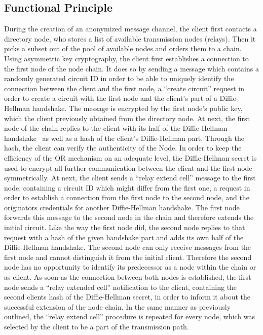 \documentclass{sig-alternate}
\begin{document}
\subsection{Functional Principle}
During the creation of an anonymized message channel, the client first contacts a directory node, who stores a list of available transmission nodes (relays).  Then it picks a subset out of the pool of available nodes and orders them to a chain. Using asymmetric key cryptography, the client first establishes a connection to the first node of the node chain. It does so by sending a message which contains a randomly generated circuit ID in order to be able to uniquely identify the connection between the client and the first node, a ``create circuit'' request in order to create a circuit with the first node and the client's part of a Diffie-Hellman handshake. The message is encrypted by the first node's public key, which the client previously obtained from the directory node. At next, the first node of the chain replies to the client with its half of the Diffie-Hellman handshake~\cite{diffie1976new} as well as a hash of the client's Diffie-Hellman part. Through the hash, the client can verify the authenticity of the Node. In order to keep the efficiency of the OR mechanism on an adequate level, the Diffie-Hellman secret is used to encrypt all further communication between the client and the first node symmetrically. At next, the client sends a ``relay extend cell'' message to the first node, containing a circuit ID which might differ from the first one, a request in order to establish a connection from the first node to the second node, and the originators credentials for another Diffie-Hellman handshake. The first node forwards this message to the second node in the chain and therefore extends the initial circuit. Like the way the first node did, the second node replies to that request with a hash of the given handshake part and adds its own half of the Diffie-Hellman handshake. The second node can only receive messages from the first node and cannot distinguish it from the initial client. Therefore the second node has no opportunity to identify its predecessor as a node within the chain or as client. As soon as the connection between both nodes is established, the first node sends a ``relay extended cell'' notification to the client, containing the second clients hash of the Diffie-Hellman secret, in order to inform it about the successful extension of the node chain. In the same manner as previously outlined, the ``relay extend cell'' procedure is repeated for every node, which was selected by the client to be a part of the transmission path.
\end{document}
